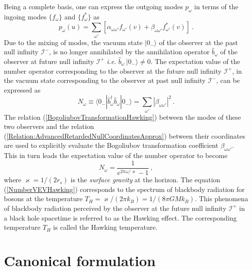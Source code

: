 \documentclass[aps,12pt,showpacs]{revtex4-2}
\def\ksg{\mathrm{\varkappa}}
\def\rs{r_s}
\def\scriplus{\mathscr{I}^{+}}
\def\scriminus{\mathscr{I}^{-}}
\begin{document}
Being a complete basis, one can express the outgoing modes $p_{\omega}$ in 
terms of the ingoing modes $\{{f}_{\omega}\}$ and $\{{f}^{*}_{\omega}\}$ as
%
\begin{equation}\label{BogoliubovTransformationHawking}
{p}_{\omega}(u) =  \sum_{\omega'} \left[ \alpha_{\omega\omega'} {f}_{\omega'}(v)
+ \beta_{\omega\omega'} {f}^{*}_{\omega'}(v) \right] ~.
\end{equation}
%
Due to the mixing of modes, the vacuum state $|0_{-}\rangle$ of the observer at 
the past null infinity $\scriminus$, is no longer annihilated by the 
annihilation operator $\hat{b}_{\omega}$ of the observer at future null 
infinity 
$\scriplus$ \emph{i.e.} $\hat{b}_{\omega}~|0_{-}\rangle \ne 0$. The expectation 
value of the number operator corresponding to the observer at the future null 
infinity $\scriplus$, in the vacuum state corresponding to the observer at 
past null infinity $\scriminus$, can be expressed as
%
\begin{equation}\label{NumberVEVDefinitionHawking}
{N}_{\omega} \equiv 
\langle 0_{-}| \hat{b}^{\dagger}_{\omega} \hat{b}_{\omega} |0_{-}\rangle
=  \sum_{\omega'} |\beta_{\omega\omega'}|^2 ~.
\end{equation}
%
The relation (\ref{BogoliubovTransformationHawking}) between the modes of these 
two observers and the relation 
(\ref{Relation:AdvancedRetardedNullCoordinatesApprox}) between their 
coordinates are used to explicitly evaluate the Bogoliubov transformation
coefficient $\beta_{\omega\omega'}$. This in turn leads the expectation 
value of the number operator to become
%
\begin{equation}\label{NumberVEVHawking}
{N}_{\omega} = \frac{1}{e^{2\pi\omega/\ksg} - 1}  ~,
\end{equation}
%
where $\ksg=1/(2\rs)$ is the \emph{surface gravity} at the horizon. The 
equation 
(\ref{NumberVEVHawking}) corresponds to the spectrum of blackbody radiation for 
bosons at the temperature $T_H = \ksg/(2\pi k_B) = 1/(8\pi G M k_B)$. This 
phenomena of blackbody radiation perceived by the observer at the future null 
infinity $\scriplus$ in a black hole spacetime is referred to as the Hawking 
effect. The corresponding temperature $T_H$ is called the Hawking temperature. 




\section{Canonical formulation}\label{Canonical-formulation}
\end{document}
